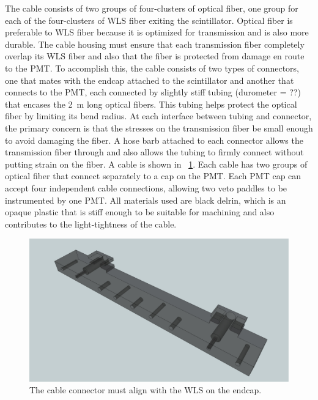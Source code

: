 The cable consists of two groups of four-clusters of optical fiber, one group for each of the four-clusters of WLS fiber exiting the scintillator.  Optical fiber is preferable to WLS fiber because it is optimized for transmission and is also more durable.  The cable housing must ensure that each transmission fiber completely overlap its WLS fiber and also that the fiber is protected from damage en route to the PMT.  To accomplish this, the cable consists of two types of connectors, one that mates with the endcap attached to the scintillator and another that connects to the PMT, each connected by slightly stiff tubing (durometer = ??) that encases the 2~m long optical fibers.  This tubing helps protect the optical fiber by limiting its bend radius.  At each interface between tubing and connector, the primary concern is that the stresses on the transmission fiber be small enough to avoid damaging the fiber.  A hose barb attached to each connector allows the transmission fiber through and also allows the tubing to firmly connect without putting strain on the fiber.  A cable is shown in {\fig}~\ref{fig:paddleCable}.  Each cable has two groups of optical fiber that connect separately to a cap on the PMT.  Each PMT cap can accept four independent cable connections, allowing two veto paddles to be instrumented by one PMT.  All materials used are black delrin, which is an opaque plastic that is stiff enough to be suitable for machining and also contributes to the light-tightness of the cable.  
\begin{figure}[htp]
\centering
\includegraphics[width=1.0\textwidth]{figures/paddle_connector.eps}
\caption{The cable connector must align with the WLS on the endcap.}
\label{fig:paddleCable}
\end{figure}

